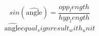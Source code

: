 \[sin(\widehat{{\text{{{angle}}}}})=\frac{{{opp_length}}}{{{hyp_length}}}\]
\[\widehat{{\text{{{angle}}}}}{equal_sign}{result_with_unit}\]
